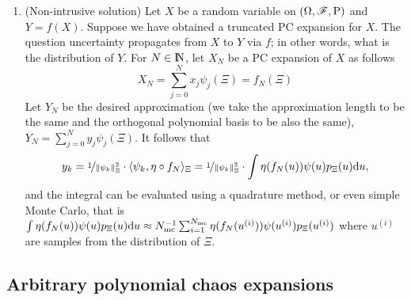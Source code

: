 \documentclass[a4paper,10pt]{article}
\begin{document}
\begin{enumerate}
 \item (Non-intrusive solution) Let \(X\) be a random variable on \((\Omega,\mathscr{F},\mathrm{P})\) and \(Y=f(X)\). Suppose we have obtained a
       truncated PC expansion for \(X\). The question uncertainty propagates from \(X\) to \(Y\)
       via \(f\); in other words, what is the distribution of \(Y\). For \(N\in\N\), let \(X_N\) be 
       a PC expansion of \(X\) as follows
       \[
        X_N = \sum_{j=0}^{N} x_j \psi_j(\Xi) = f_N(\Xi)
       \]
       Let \(Y_N\) be the desired approximation (we take the approximation length to be the same and 
       the orthogonal polynomial basis to be also the same), 
       \(
        Y_N = \sum_{j=0}^{N} y_j \psi_j(\Xi).
       \)
       It follows that 
       \[
        y_k = \nicefrac{1}{\|\psi_k\|^2_\Xi} \cdot \langle\psi_k, \eta\circ f_N\rangle_\Xi =  \nicefrac{1}{\|\psi_k\|^2_\Xi} \cdot \int \eta(f_N(u)) \psi(u) p_\Xi(u) \mathrm{d} u,
       \]
       and the integral can be evaluated using a quadrature method, or even simple Monte Carlo, that is
       \(
       \int \eta(f_N(u)) \psi(u) p_\Xi(u) \mathrm{d} u 
       \approx 
       N_{\mathrm{mc}}^{-1}\sum_{i=1}^{N_{\mathrm{mc}}} \eta(f_N(u^{(i)})) \psi(u^{(i)}) p_\Xi(u^{(i)})
       \)
       where \(u^{(i)}\) are samples from the distribution of \(\Xi\).


\end{enumerate}



\subsection{Arbitrary polynomial chaos expansions}
\end{document}
